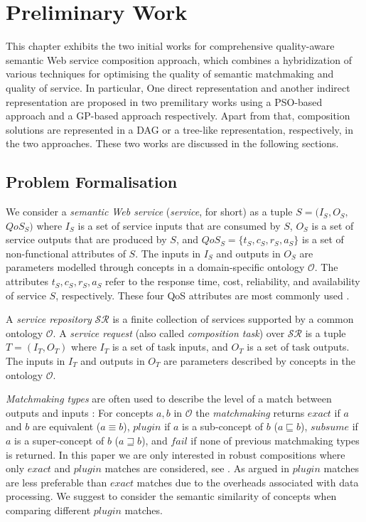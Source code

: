\chapter{Preliminary Work}\label{C:preliminary}

This chapter exhibits the two initial works for comprehensive quality-aware semantic Web service composition approach, which combines a hybridization of various techniques for optimising the quality of semantic matchmaking and quality of service. In particular,  One direct representation and another indirect representation are proposed in two premilitary works using a PSO-based approach and a GP-based approach respectively. Apart from that, composition solutions are represented in a DAG or a tree-like representation,  respectively, in the two approaches. These two works are discussed in the following sections.

\section{Problem Formalisation}\label{problemDes}

We consider a \emph{semantic Web service} (\emph{service}, for short) as a tuple $S =(I_{S}, O_{S}, $ $QoS_S)$ where $I_{S}$ is a set of service inputs that are consumed by $S$, $O_{S}$ is a set of service outputs that are produced by $S$, and $QoS_{S}=\{t_S, c_S, r_S, a_S\}$ is a set of non-functional attributes of $S$. The inputs in $I_{S}$ and outputs in $O_{S}$ are parameters modelled through concepts in a domain-specific ontology $\mathcal{O}$. The attributes $t_S, c_S, r_S, a_S$ refer to the response time, cost, reliability, and availability of service $S$, respectively. These four QoS attributes are most commonly used \cite{zeng2003quality}.

A \emph{service repository} $\mathcal{SR}$ is a finite collection of services supported by a common ontology $\mathcal{O}$. A \emph{service request} (also called \emph{composition task}) over $\mathcal{SR}$ is a tuple $T=(I_{T}, O_{T})$ where $I_{T}$ is a set of task inputs, and $O_{T}$ is a set of task outputs. The inputs in $I_{T}$ and outputs in $O_{T}$ are parameters described by concepts in the ontology $\mathcal{O}$.

\emph{Matchmaking types} are often used to describe the level of a match between outputs and inputs \cite{paolucci2002semantic}: For concepts $a, b$ in $\mathcal{O}$ the \emph{matchmaking} returns $exact$ if $a$ and $b$ are equivalent ($a \equiv b$), $plugin$ if $a$ is a sub-concept of $b$ ($a \sqsubseteq b$), $subsume$ if $a$ is a super-concept of $b$ ($a \sqsupseteq b$), and $fail$ if none of previous matchmaking types is returned. In this paper we are only interested in robust compositions where only $exact$ and $plugin$ matches are considered, see \cite{lecue2009optimizing}. As argued in \cite{lecue2009optimizing} $plugin$ matches are less preferable than $exact$ matches due to the overheads associated with data processing. We suggest to consider the semantic similarity of concepts when comparing different $plugin$ matches.


